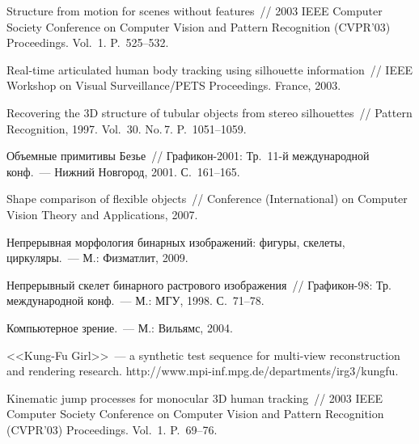 \begin{multicols}{2}
{{\begin{thebibliography}{99}
Structure from motion for scenes without features~// 2003 IEEE Computer Society 
Conference on Computer Vision and Pattern Recognition (CVPR'03) Proceedings. 
Vol.~1. P.~525--532.

 Real-time articulated human body tracking using silhouette 
information~// IEEE Workshop on Visual Surveillance/PETS Proceedings. France, 
2003.

Recovering the 3D structure of tubular objects from stereo silhouettes~// Pattern 
Recognition, 1997. Vol.~30. No.\,7. P.~1051--1059.

Объемные примитивы Безье~// Графикон-2001: Тр.\ 11-й международной 
конф.~--- Нижний Новгород, 2001. С.~161--165.

Shape comparison of flexible objects~//  Conference (International) on Computer 
Vision Theory and Applications, 2007.

Непрерывная морфология бинарных изображений: фигуры, скелеты, 
циркуляры.~--- М.: Физматлит, 2009.

Непрерывный скелет бинарного раст\-ро\-во\-го изображения~// Графикон-98: Тр. 
международной конф.~--- М.: МГУ, 1998. С.~71--78. 

Компьютерное зрение.~--- М.: Вильямс, 2004.

<<Kung-Fu Girl>>~--- a synthetic test sequence for multi-view reconstruction and 
rendering research. {\sf http://www.\linebreak mpi-inf.mpg.de/departments/irg3/kungfu}.


\label{end\stat}

Kinematic jump processes for monocular 3D human tracking~// 2003 IEEE 
Computer Society Conference on Computer Vision and Pattern Recognition 
(CVPR'03) Proceedings. Vol.~1. P.~69--76.

 \end{thebibliography}
}
}


\end{multicols}